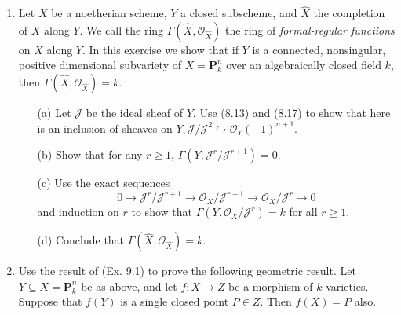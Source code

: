 \documentclass[12pt]{article}
\newcommand{\OO}{\mathscr{O}}
\newcommand{\PP}{\mathbf{P}}
\begin{document}
\begin{enumerate} [label=\textbf{\arabic*.}, leftmargin=0em]


\item Let $X$ be a noetherian scheme, $Y$ a closed subscheme, and $\hat{X}$ the completion of $X$ along $Y$. We call the ring $\Gamma(\hat{X}, \OO_{\hat{X}})$ the ring of \textit{formal-regular functions} on $X$ along $Y$. In this exercise we show that if $Y$ is a connected, nonsingular, positive dimensional subvariety of $X = \PP_k^n$ over an algebraically closed field $k$, then $\Gamma(\hat{X}, \OO_{\hat{X}}) = k$.
\begin{itemize}
    \item[(a)] Let $\mathscr{J}$ be the ideal sheaf of $Y$. Use (8.13) and (8.17) to show that here is an inclusion of sheaves on $Y, \mathscr{J} / \mathscr{J}^2 \hookrightarrow \OO_Y(-1)^{n + 1}$.
    \item[(b)] Show that for any $r \geq 1$, $\Gamma(Y, \mathscr{J}^r / \mathscr{J}^{r + 1}) = 0$.
    \item[(c)] Use the exact sequences
    \begin{equation*}
        0 \to \mathscr{J}^r / \mathscr{J}^{r + 1} \to \OO_X / \mathscr{J}^{r + 1} \to \OO_X / \mathscr{J}^r \to 0
    \end{equation*}
    and induction on $r$ to show that $\Gamma(Y, \OO_X/\mathscr{J}^r) = k$ for all $r \geq 1$.
    \item[(d)] Conclude that $\Gamma(\hat{X}, \OO_{\hat{X}}) = k$.
\end{itemize}

\item Use the result of (Ex. 9.1) to prove the following geometric result. Let $Y \subseteq X = \PP_k^n$ be as above, and let $f : X \to Z$ be a morphism of $k$-varieties. Suppose that $f(Y)$ is a single closed point $P \in Z$. Then $f(X) = P$ also.


\end{enumerate}
\end{document}
